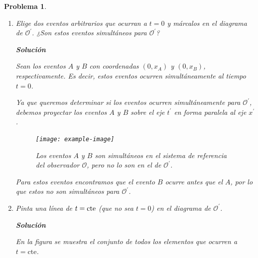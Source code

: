 \documentclass[12pt]{article}
\theoremstyle{break}
\newtheorem{exercise}{Problema}
\theoremstyle{nonumberbreak}
\newcommand*{\observer}{\mathcal{O}}
\newcommand*{\primeobserver}{\mathcal{O}^{\prime}}
\newcommand*{\inlinesol}{\vspace*{10pt}\textbf{Solución}\vspace*{10pt}}
\begin{document}
\begin{exercise}
\begin{enumerate}[label = \alph*)]
            \inlinesol
            
            Sabemos que el ángulo entre \(t\) y \(t^{\prime}\) y entre \(x\) y \(x^{\prime}\) debe ser el mismo, entonce el eje \(x\) forma un ángulo \(\theta\) con el eje \(x^{\prime}\) como se muestra en la figura siguiente:

            \begin{figure}[htb]
                \centering
                \texttt{[image: example-image]}
                \caption{Diagrama espacio-tiempo de \(\observer\) desde la perspectiva de \(\primeobserver\).}
                \label{fig:spacetime-Observer}
            \end{figure}

            \item Elige dos eventos arbitrarios que ocurran a \(t = 0\) y márcalos en el diagrama de \(\primeobserver\). ¿Son estos eventos simultáneos para \(\primeobserver\)?
            
            \inlinesol
            
            Sean los eventos \(A\) y \(B\) con coordenadas \((0, x_{A})\) y \((0, x_{B})\), respectivamente. Es decir, estos eventos ocurren simultáneamente al tiempo \(t = 0\).

            Ya que queremos determinar si los eventos ocurren simultáneamente para \(\primeobserver\), debemos proyectar los eventos \(A\) y \(B\) sobre el eje \(t^{\prime}\) en forma paralela al eje \(x^{\prime}\).

            \begin{figure}[htb]
                \centering
                \texttt{[image: example-image]}
                \caption{Los eventos \(A\) y \(B\) son simultáneos en el sistema de referencia del observador \(\observer\), pero no lo son en el de \(\primeobserver\).}
                \label{fig:events-simultainety}
            \end{figure}

            Para estos eventos encontramos que el evento \(B\) ocurre antes que el \(A\), por lo que estos no son simultáneos para \(\primeobserver\).

            \item Pinta una línea de \(t = \textnormal{cte}\) (que no sea \(t = 0\)) en  el diagrama de \(\primeobserver\).
            
            \inlinesol

            En la figura se muestra el conjunto de todos los elementos que ocurren a \(t = \text{cte}\).


\end{enumerate}
\end{exercise}
\end{document}
